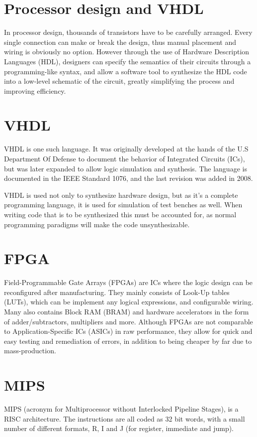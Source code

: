\section{Processor design and VHDL}
In processor design, thousands of transistors have to be carefully arranged.
Every single connection can make or break the design, thus manual placement and
wiring is obviously no option.  However through the use of Hardware Description
Languages (HDL), designers can specify the semantics of their circuits through a
programming-like syntax, and allow a software tool to synthesize the HDL code
into a low-level schematic of the circuit, greatly simplifying the process and
improving efficiency.

\section{VHDL}
VHDL is one such language.  It was originally developed at the hands of the U.S
Department Of Defense to document the behavior of Integrated Circuits (ICs), but
was later expanded to allow logic simulation and synthesis. The language is
documented in the IEEE Standard 1076, and the last revision was added in
2008.\cite{ieee-1076}

VHDL is used not only to synthesize hardware design, but as it's a complete
programming language, it is used for simulation of test benches as well. When
writing code that is to be synthesized this must be accounted for, as normal
programming paradigms will make the code unsynthesizable.


\section{FPGA}
Field-Programmable Gate Arrays (FPGAs) are ICs where the logic design can be
reconfigured after manufacturing.  They mainly consists of Look-Up tables
(LUTs), which can be implement any logical expressions, and configurable wiring.
Many also contains Block RAM (BRAM) and hardware accelerators in the form of
adder/subtractors, multipliers and more.  Although FPGAs are not comparable to
Application-Specific ICs (ASICs) in raw performance, they allow for quick and
easy testing and remediation of errors, in addition to being cheaper by far due
to mass-production.


\section{MIPS}
MIPS (acronym for Multiprocessor without Interlocked Pipeline Stages), is a RISC
architecture. The instructions are all coded as 32 bit words, with a small
number of different formats, R, I and J (for register, immediate and jump). 

